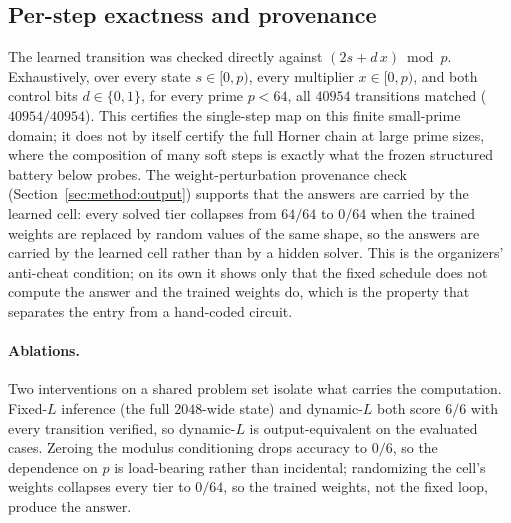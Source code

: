 \documentclass[11pt]{article}
\begin{document}
\subsection{Per-step exactness and provenance}
\label{sec:results:perstep}

The learned transition was checked directly against $(2s + d\,x)\bmod p$.
Exhaustively, over every state $s \in [0,p)$, every multiplier $x \in [0,p)$, and
both control bits $d \in \{0,1\}$, for every prime $p < 64$, all $40954$
transitions matched ($40954/40954$). This certifies the single-step map on this finite small-prime domain; it does
not by itself certify the full Horner chain at large prime sizes, where the
composition of many soft steps is exactly what the frozen structured battery below probes.
The weight-perturbation provenance check
(Section~\ref{sec:method:output}) supports that the answers are carried by the learned cell: every solved tier collapses from
$64/64$ to $0/64$ when the trained weights are replaced by random values of the
same shape, so the answers are carried by the learned cell rather than by a hidden
solver. This is the organizers' anti-cheat condition; on its own it shows only that
the fixed schedule does not compute the answer and the trained weights do, which is
the property that separates the entry from a hand-coded circuit.

\paragraph{Ablations.}
Two interventions on a shared problem set isolate what carries the computation.
Fixed-$L$ inference (the full $2048$-wide state) and dynamic-$L$ both score $6/6$ with
every transition verified, so dynamic-$L$ is output-equivalent on the evaluated cases.
Zeroing the modulus conditioning drops accuracy to $0/6$, so the dependence on $p$ is
load-bearing rather than incidental; randomizing the cell's weights collapses every
tier to $0/64$, so the trained weights, not the fixed loop, produce the answer.
\end{document}
